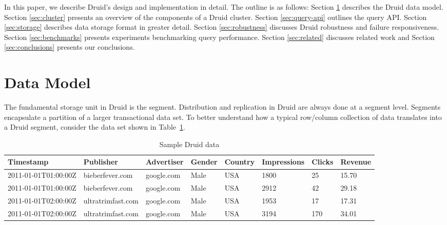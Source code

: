 \documentclass{vldb}
\begin{document}
In this paper, we describe Druid's design and implementation in detail. The outline is as follows: Section \ref{sec:data-model} describes the Druid data model. Section \ref{sec:cluster} presents an overview of the components of a Druid cluster. Section \ref{sec:query-api} outlines the query API. Section \ref{sec:storage} describes data storage format in greater detail. Section \ref{sec:robustness} discusses Druid robustness and failure responsiveness. Section \ref{sec:benchmarks} presents experiments benchmarking query performance. Section \ref{sec:related} discusses related work and Section \ref{sec:conclusions} presents our conclusions.

\section{Data Model}
\label{sec:data-model}
The fundamental storage unit in Druid is the segment. Distribution and
replication in Druid are always done at a segment level. Segments
encapsulate a partition of a larger transactional data set. To better
understand how a typical row/column collection of data translates into
a Druid segment, consider the data set shown in Table~\ref{tab:sample_data}.

\begin{table}
  \centering
  \caption{Sample Druid data}
  \label{tab:sample_data}
  \begin{tabular}{| l | l | l | l | l | l | l | l |}
    \hline
    \textbf{Timestamp} & \textbf{Publisher} & \textbf{Advertiser} & \textbf{Gender} & \textbf{Country} & \textbf{Impressions} & \textbf{Clicks} & \textbf{Revenue} \\ \hline
    2011-01-01T01:00:00Z & bieberfever.com & google.com & Male & USA & 1800 & 25 & 15.70 \\ \hline
    2011-01-01T01:00:00Z & bieberfever.com & google.com & Male & USA & 2912 & 42 & 29.18 \\ \hline
    2011-01-01T02:00:00Z & ultratrimfast.com & google.com & Male & USA & 1953 & 17 & 17.31 \\ \hline
    2011-01-01T02:00:00Z & ultratrimfast.com & google.com & Male & USA & 3194 & 170 & 34.01 \\ \hline
  \end{tabular}
\end{table}
\end{document}

